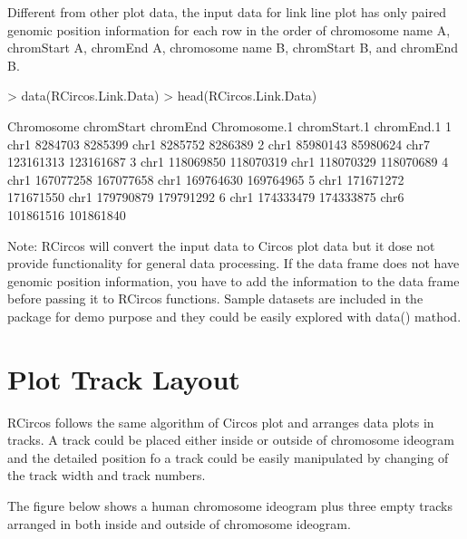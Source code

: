 \documentclass{article}
\begin{document}
Different from other plot data, the input data for link line plot has only paired genomic position information for each row in the order of chromosome name A, chromStart A, chromEnd A, chromosome name B, chromStart B, and chromEnd B.


\begin{Schunk}
\begin{Sinput}
> data(RCircos.Link.Data)
> head(RCircos.Link.Data)
\end{Sinput}
\begin{Soutput}
  Chromosome chromStart  chromEnd Chromosome.1 chromStart.1 chromEnd.1
1       chr1    8284703   8285399         chr1      8285752    8286389
2       chr1   85980143  85980624         chr7    123161313  123161687
3       chr1  118069850 118070319         chr1    118070329  118070689
4       chr1  167077258 167077658         chr1    169764630  169764965
5       chr1  171671272 171671550         chr1    179790879  179791292
6       chr1  174333479 174333875         chr6    101861516  101861840
\end{Soutput}
\end{Schunk}


Note: RCircos will convert the input data to Circos plot data but it dose not provide functionality for general data processing. If the data frame does not have genomic position information, you have to add the information to the data frame before passing it to RCircos functions. Sample datasets are included in the package for demo purpose and they could be easily explored with data() mathod. 



\section{Plot Track Layout}

RCircos follows the same algorithm of Circos plot and arranges data plots in tracks. A track could be placed either inside or outside of chromosome ideogram and the detailed position fo a track could be easily manipulated by changing  of the track width and track numbers.


The figure below shows a human chromosome ideogram plus three empty tracks arranged in both inside and outside of chromosome ideogram.
\end{document}
